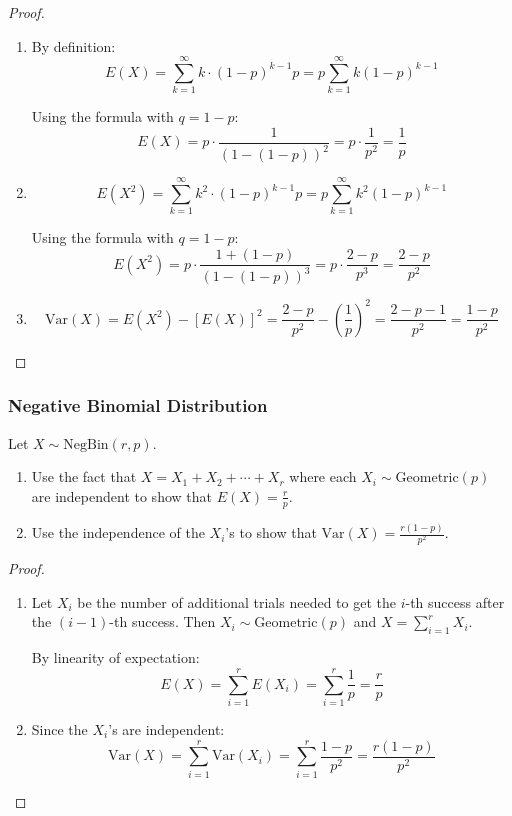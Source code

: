 \begin{proof}
\begin{enumerate}[label=(\alph*)]
    \item By definition:
    \[
    E(X) = \sum_{k=1}^{\infty} k \cdot (1-p)^{k-1} p = p \sum_{k=1}^{\infty} k (1-p)^{k-1}
    \]
    
    Using the formula with \(q = 1-p\):
    \[
    E(X) = p \cdot \frac{1}{(1-(1-p))^2} = p \cdot \frac{1}{p^2} = \frac{1}{p}
    \]
    
    \item 
    \[
    E(X^2) = \sum_{k=1}^{\infty} k^2 \cdot (1-p)^{k-1} p = p \sum_{k=1}^{\infty} k^2 (1-p)^{k-1}
    \]
    
    Using the formula with \(q = 1-p\):
    \[
    E(X^2) = p \cdot \frac{1+(1-p)}{(1-(1-p))^3} = p \cdot \frac{2-p}{p^3} = \frac{2-p}{p^2}
    \]
    
    \item 
    \[
    \text{Var}(X) = E(X^2) - [E(X)]^2 = \frac{2-p}{p^2} - \left(\frac{1}{p}\right)^2 = \frac{2-p-1}{p^2} = \frac{1-p}{p^2}
    \]
\end{enumerate}
\end{proof}

\subsubsection{Negative Binomial Distribution}

\begin{exercise}
Let \(X \sim \text{NegBin}(r, p)\).

\begin{enumerate}[label=(\alph*)]
    \item Use the fact that \(X = X_1 + X_2 + \cdots + X_r\) where each \(X_i \sim \text{Geometric}(p)\) are independent to show that \(E(X) = \frac{r}{p}\).
    \item Use the independence of the \(X_i\)'s to show that \(\text{Var}(X) = \frac{r(1-p)}{p^2}\).
\end{enumerate}
\end{exercise}

\begin{proof}
\begin{enumerate}[label=(\alph*)]
    \item Let \(X_i\) be the number of additional trials needed to get the \(i\)-th success after the \((i-1)\)-th success. Then \(X_i \sim \text{Geometric}(p)\) and \(X = \sum_{i=1}^{r} X_i\).
    
    By linearity of expectation:
    \[
    E(X) = \sum_{i=1}^{r} E(X_i) = \sum_{i=1}^{r} \frac{1}{p} = \frac{r}{p}
    \]
    
    \item Since the \(X_i\)'s are independent:
    \[
    \text{Var}(X) = \sum_{i=1}^{r} \text{Var}(X_i) = \sum_{i=1}^{r} \frac{1-p}{p^2} = \frac{r(1-p)}{p^2}
    \]
\end{enumerate}
\end{proof}


